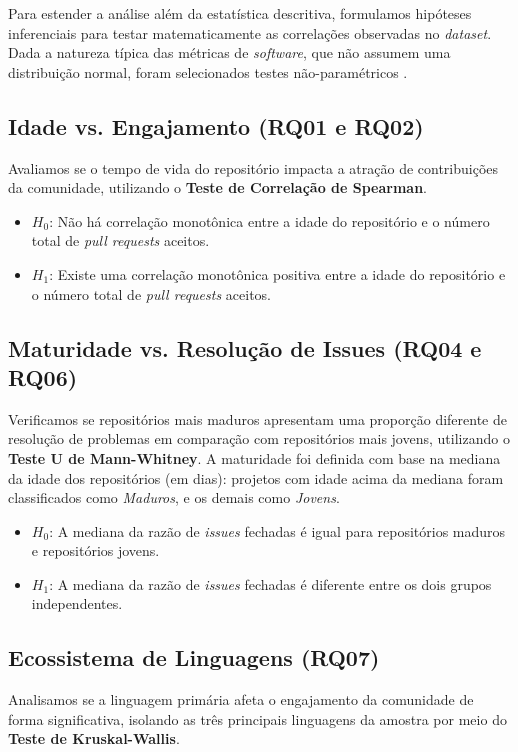 \documentclass[
	article,			%
	11pt,				%
	oneside,			%
	a4paper,			%
	english,			%
	brazil,				%
	sumario=tradicional
	]{abntex2}
\begin{document}
Para estender a análise além da estatística descritiva, formulamos hipóteses inferenciais para testar matematicamente as correlações observadas no \textit{dataset}. Dada a natureza típica das métricas de \textit{software}, que não assumem uma distribuição normal, foram selecionados testes não-paramétricos \cite{borges2016understanding}.

\subsection{Idade vs. Engajamento (RQ01 e RQ02)}
Avaliamos se o tempo de vida do repositório impacta a atração de contribuições da comunidade, utilizando o \textbf{Teste de Correlação de Spearman}.

\begin{itemize}
    \item $H_0$: Não há correlação monotônica entre a idade do repositório e o número total de \textit{pull requests} aceitos.
    \item $H_1$: Existe uma correlação monotônica positiva entre a idade do repositório e o número total de \textit{pull requests} aceitos.
\end{itemize}

\subsection{Maturidade vs. Resolução de Issues (RQ04 e RQ06)}

Verificamos se repositórios mais maduros apresentam uma proporção diferente de resolução de problemas em comparação com repositórios mais jovens, utilizando o \textbf{Teste U de Mann-Whitney}. A maturidade foi definida com base na mediana da idade dos repositórios (em dias): projetos com idade acima da mediana foram classificados como \textit{Maduros}, e os demais como \textit{Jovens}.

\begin{itemize} \item $H_0$: A mediana da razão de \textit{issues} fechadas é igual para repositórios maduros e repositórios jovens. \item $H_1$: A mediana da razão de \textit{issues} fechadas é diferente entre os dois grupos independentes. \end{itemize}


\subsection{Ecossistema de Linguagens (RQ07)}
Analisamos se a linguagem primária afeta o engajamento da comunidade de forma significativa, isolando as três principais linguagens da amostra por meio do \textbf{Teste de Kruskal-Wallis}.
\end{document}
